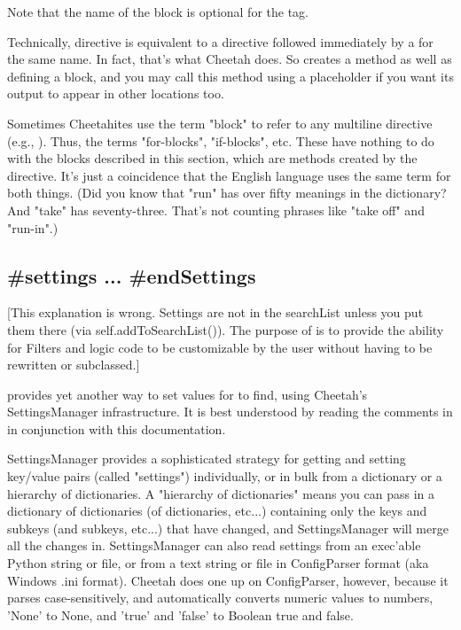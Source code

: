 Note that the name of the block is optional for the  tag.

Technically,  directive is equivalent to a  directive
followed immediately by a  for the same name.  In fact,
that's what Cheetah does.  So  creates a method as well as
defining a block, and you may call this method using a placeholder if you want
its output to appear in other locations too.

Sometimes Cheetahites use the term "block" to refer to any multiline directive
(e.g., ).  Thus, the terms "for-blocks", "if-blocks",
etc.  These have nothing to do with the blocks described in this section, which
are methods created by the  directive.  It's just a coincidence
that the English language uses the same term for both things.  (Did you know 
that "run" has over fifty meanings in the dictionary?  And "take" has
seventy-three.  That's not counting phrases like "take off" and "run-in".)


\subsection{\#settings ... \#endSettings}
\label{inheritanceEtc.settings}

[This explanation is wrong.  Settings are not in the searchList unless you
put them there (via self.addToSearchList()).  The purpose of
 is to provide the ability for Filters and logic code to be
customizable by the user without having to be rewritten or subclassed.]

 provides yet another way to set values for
 to find, using Cheetah's SettingsManager infrastructure.
It is best understood by reading the comments in
 in conjunction with this documentation.

SettingsManager provides a sophisticated strategy for getting and setting
key/value pairs (called "settings") individually, or in bulk from a dictionary
or a hierarchy of dictionaries.  A "hierarchy of dictionaries" means you can
pass in a dictionary of dictionaries (of dictionaries, etc...) containing only
the keys and subkeys (and subkeys, etc...) that have changed, and
SettingsManager will merge all the changes in.  SettingsManager can also read
settings from an exec'able Python string or file, or from a text string or file in ConfigParser format (aka Windows .ini format).  Cheetah does one up on 
ConfigParser, however, because it parses case-sensitively, and automatically
converts numeric values to numbers, 'None' to None, and 'true' and 'false' to
Boolean true and false.  

